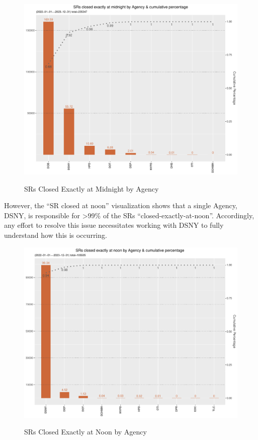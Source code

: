 \documentclass[12pt, titlepage]{article}
\begin{document}
{	\begin{figure}[tbp]
		 \centering
		 \caption{SRs Closed Exactly at Midnight by Agency}
		 \includegraphics[width = \textwidth]{closed_at_midnight_chart.pdf}
		 \label{fig:midnight-closed}
	\end{figure}	

	However, the ``SR closed at noon'' visualization shows that  a single Agency, DSNY,
	is responsible for \textgreater{}99\% of the SRs ``closed-exactly-at-noon''. Accordingly, any effort to resolve this issue
	necessitates working with DSNY to fully understand how this is occurring. 
	
	\begin{figure}[tbp]
		 \centering
		  \caption{SRs Closed Exactly at Noon by Agency}
		 \includegraphics[width = \textwidth]{closed_at_noon_chart.pdf}
		 \label{fig:noon-closed}
	\end{figure}	
	
}
\end{document}
